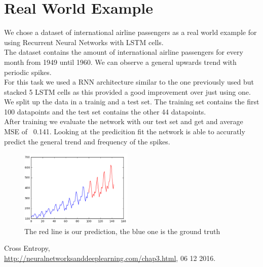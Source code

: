 \documentclass[twoside, twocolumn]{article}
\begin{document}
\section{Real World Example}

We chose a dataset of international airline passengers as a real world example for using Recurrent Neural Networks with LSTM cells. \\
The dataset contains the amount of international airline passengers for every month from 1949 until 1960. We can observe a general upwards trend with periodic spikes. \\
For this task we used a RNN architecture similar to the one previously used but stacked 5 LSTM cells as this provided a good improvement over just using one. \\
We split up the data in a trainig and a test set. The training set contains the first 100 datapoints and the test set contains the other 44 datapoints. \\
After training we evaluate the network with our test set and get and average MSE of ~0.141. Looking at the predicition fit the network is able to accuratly predict the general trend and frequency of the spikes.

\begin{figure}[htb]
\centering
	\includegraphics[width=0.48\textwidth]{rnn_plane_fit.png}
	\caption{The red line is our prediction, the blue one is the ground truth}
\end{figure}


\begin{thebibliography}{99} %

Cross Entropy,\\ \url{http://neuralnetworksanddeeplearning.com/chap3.html}, 06 12 2016.

\end{thebibliography}

\end{document}
